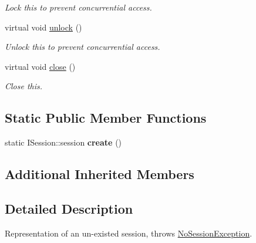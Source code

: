 \begin{DoxyCompactItemize}
\begin{DoxyCompactList}\small\item\em Lock this to prevent concurrential access. \end{DoxyCompactList}\item 
\hypertarget{class_no_session_a29d4e5968930eb6d8c49ec5cdd3589ac}{virtual void \hyperlink{class_no_session_a29d4e5968930eb6d8c49ec5cdd3589ac}{unlock} ()}\label{class_no_session_a29d4e5968930eb6d8c49ec5cdd3589ac}

\begin{DoxyCompactList}\small\item\em Unlock this to prevent concurrential access. \end{DoxyCompactList}\item 
\hypertarget{class_no_session_ae821b6733f6865c6c18207841fe20bbd}{virtual void \hyperlink{class_no_session_ae821b6733f6865c6c18207841fe20bbd}{close} ()}\label{class_no_session_ae821b6733f6865c6c18207841fe20bbd}

\begin{DoxyCompactList}\small\item\em Close this. \end{DoxyCompactList}\end{DoxyCompactItemize}
\subsection*{Static Public Member Functions}
\begin{DoxyCompactItemize}
\item 
\hypertarget{class_no_session_aba3f88ce7d1008ffcf0838b1d90e6512}{static I\-Session\-::session {\bfseries create} ()}\label{class_no_session_aba3f88ce7d1008ffcf0838b1d90e6512}

\end{DoxyCompactItemize}
\subsection*{Additional Inherited Members}


\subsection{Detailed Description}
Representation of an un-\/existed session, throws \hyperlink{class_no_session_exception}{No\-Session\-Exception}. 

